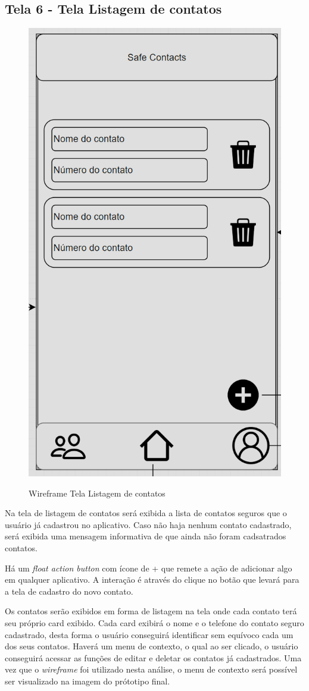 \subsection{Tela 6 - Tela Listagem de contatos}
\begin{figure}[H]
  \begin{center}
  \includegraphics[width=0.2\linewidth]{images/wire-tela-listagem-contatos.png}\\
  \end{center}
  \caption[Wireframe Tela Listagem de contatos]{Wireframe Tela Listagem de contatos}
  \label{fig:wireframe-tela-listagem-contatos}
\end{figure}
Na tela de listagem de contatos será exibida a lista de contatos seguros que o usuário já cadastrou no aplicativo. Caso não haja nenhum contato cadastrado, será exibida uma mensagem informativa de que ainda não foram cadsatrados contatos. 

Há um \emph{float action button} com ícone de + que remete a ação de adicionar algo em qualquer aplicativo. A interação é através do clique no botão que levará para a tela de cadastro do novo contato.

Os contatos serão exibidos em forma de listagem na tela onde cada contato terá seu próprio card exibido. Cada card exibirá o nome e o telefone do contato seguro cadastrado, desta forma o usuário conseguirá identificar sem equívoco cada um dos seus contatos. Haverá um menu de contexto, o qual ao ser clicado, o usuário conseguirá acessar as funções de editar e deletar os contatos já cadastrados. Uma vez que o \emph{wireframe} foi utilizado nesta análise, o menu de contexto será possível ser visualizado na imagem do prótotipo final. 

